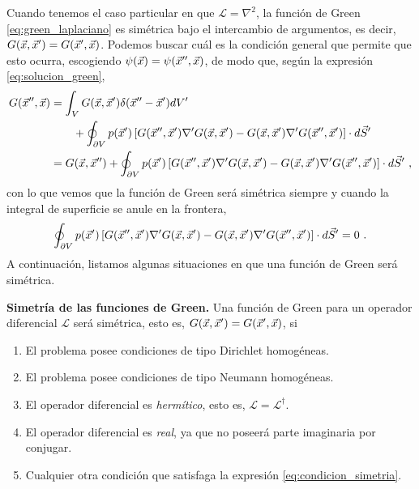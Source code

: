 Cuando tenemos el caso particular en que $\mathcal{L} = \nabla^2$, la función de Green \eqref{eq:green_laplaciano} es simétrica bajo el intercambio de argumentos, es decir, $G(\vec{x}, \vec{x}') = G(\vec{x}', \vec{x})$. Podemos buscar cuál es la condición general que permite que esto ocurra, escogiendo $\psi(\vec{x}) = \psi(\vec{x}'', \vec{x})$, de modo que, según la expresión \eqref{eq:solucion_green},
\begin{align}
    \nonumber G(\vec{x}'', \vec{x}) & = \int_V G(\vec{x}, \vec{x}') \delta(\vec{x}'' - \vec{x}') dV' \\ 
    & \qquad + \oint_{\partial V} p(\vec{x}')\left[ G(\vec{x}'', \vec{x}') \nabla' G(\vec{x}, \vec{x}') - G(\vec{x}, \vec{x}') \nabla'G(\vec{x}'', \vec{x}') \right] \cdot d\vec{S}' \\
    & = G(\vec{x}, \vec{x}'') + \oint_{\partial V} p(\vec{x}')\left[ G(\vec{x}'', \vec{x}') \nabla' G(\vec{x}, \vec{x}') - G(\vec{x}, \vec{x}') \nabla'G(\vec{x}'', \vec{x}') \right] \cdot d\vec{S}' \ ,
\end{align}
con lo que vemos que la función de Green será simétrica siempre y cuando la integral de superficie se anule en la frontera, 
\begin{equation}\label{eq:condicion_simetria}
    \oint_{\partial V} p(\vec{x}')\left[ G(\vec{x}'', \vec{x}') \nabla' G(\vec{x}, \vec{x}') - G(\vec{x}, \vec{x}') \nabla'G(\vec{x}'', \vec{x}') \right] \cdot d\vec{S}' = 0 \ .
\end{equation}
A continuación, listamos algunas situaciones en que una función de Green será simétrica.

\begin{propiedad}
    \textbf{Simetría de las funciones de Green.} Una función de Green para un operador diferencial $\mathcal{L}$ será simétrica, esto es, $G(\vec{x}, \vec{x}') = G(\vec{x}', \vec{x})$, si 
    \begin{enumerate}
        \item El problema posee condiciones de tipo Dirichlet homogéneas.
        \item El problema posee condiciones de tipo Neumann homogéneas.
        \item El operador diferencial es \emph{hermítico}, esto es, $\mathcal{L} = \mathcal{L}^\dagger$.
        \item El operador diferencial es \emph{real}, ya que no poseerá parte imaginaria por conjugar.
        \item Cualquier otra condición que satisfaga la expresión \eqref{eq:condicion_simetria}.
    \end{enumerate}
\end{propiedad}

